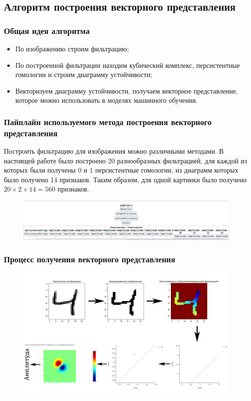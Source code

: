 \documentclass{beamer}
\begin{document}
		\subsection{Алгоритм построения векторного представления}
		\begin{frame}
			\frametitle{Общая идея алгоритма}
			\begin{itemize}
				\item По изображению строим фильтрацию;
				\item По построенной фильтрации находим кубический комплекс, персистентные гомологии и строим диаграмму устойчивости;
				\item Векторизуем диаграмму устойчивости, получаем векторное представление, которое можно использовать в моделях машинного обучения.
			\end{itemize}
		\end{frame}
		\begin{frame}
			\frametitle{Пайплайн используемого метода построения векторного представления}
			Построить фильтрацию для изображения можно различными методами. В настоящей работе было построено 20 разнообразных фильтрацией, для каждой из которых были получены $0$ и $1$ персистентные гомологии, из диаграмм которых было получено 14 признаков. Таким образом, для одной картинки было получено $20 \times 2 \times 14 = 560$ признаков.
			\begin{figure}
				\centering
				\includegraphics[width=\linewidth]{pipelineDiagram.png}
			\end{figure}
		\end{frame}
		\begin{frame}
			\frametitle{Процесс получения векторного представления}
			\begin{figure}
				\centering
				\includegraphics[width=\linewidth]{pipe.jpg}
			\end{figure}
		\end{frame}
\end{document}
